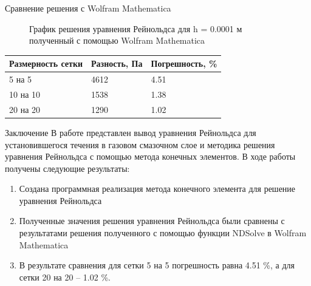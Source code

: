 \documentclass[ignoreonframetext,unicode]{beamer}
\begin{document}
\begin{frame}{Сравнение решения с Wolfram Mathematica}
	\vspace*{-4mm}
	\begin{figure}[!htbp]
		\caption{График решения уравнения Рейнольдса для h = 0.0001 м полученный с помощью Wolfram Mathematica}
		\label{exactSolutionConst}
	\end{figure}

\begin{table}[!htbp]
	\begin{tabular}{|l|l|l|}
		\hline
		\multicolumn{1}{|c|}{Размерность сетки} & \multicolumn{1}{c|}{Разность, Па} & Погрешность, \% \\ \hline
		5 на 5                                  & 4612                              & 4.51            \\ \hline
		10 на 10                                & 1538                              & 1.38            \\ \hline
		20 на 20                                & 1290                              & 1.02            \\ \hline
	\end{tabular}
\end{table}
\end{frame}

\begin{frame}{Заключение}
	В работе представлен вывод уравнения Рейнольдса для установившегося течения в газовом смазочном слое и методика решения уравнения Рейнольдса с помощью метода конечных элементов. В ходе работы получены следующие результаты:
	\begin{block}{}
	\begin{enumerate}	
		\item Создана программная реализация метода конечного элемента для решение уравнения Рейнольдса
		\item Полученные значения решения уравнения Рейнольдса были сравнены с результатами решения полученного с помощью функции NDSolve в Wolfram Mathematica
		\item В результате сравнения для сетки 5 на 5 погрешность равна 4.51 \%, а для сетки 20 на 20 -- 1.02 \%.
	\end{enumerate}
	\end{block}	
\end{frame}	
\end{document}

